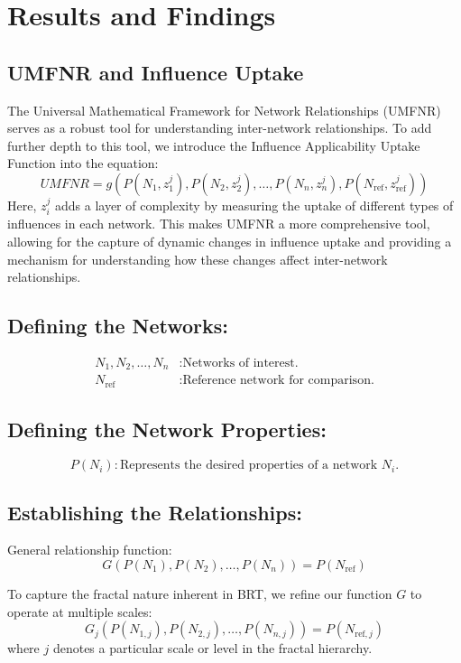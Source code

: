 \documentclass[sn-nature]{sn-jnl}%
\theoremstyle{thmstyleone}%
\theoremstyle{thmstyletwo}%
\theoremstyle{thmstylethree}%
\begin{document}
\section{Results and Findings}
\subsection{UMFNR and Influence Uptake}
The Universal Mathematical Framework for Network Relationships (UMFNR) serves as a robust tool for understanding inter-network relationships. To add further depth to this tool, we introduce the Influence Applicability Uptake Function into the equation:
\begin{equation}
UMFNR = g(P(N_1, z_1^j), P(N_2, z_2^j), \ldots, P(N_n, z_n^j), P(N_{\text{ref}}, z_{\text{ref}}^j))
\end{equation}
Here, \( z_i^j \) adds a layer of complexity by measuring the uptake of different types of influences in each network. This makes UMFNR a more comprehensive tool, allowing for the capture of dynamic changes in influence uptake and providing a mechanism for understanding how these changes affect inter-network relationships.

\subsection*{Defining the Networks:}
\begin{align*}
N_1, N_2, \dots, N_n & : \text{Networks of interest.} \\
N_{\text{ref}} & : \text{Reference network for comparison.}
\end{align*}

\subsection*{Defining the Network Properties:}
\[
P(N_i) : \text{Represents the desired properties of a network } N_i.
\]

\subsection*{Establishing the Relationships:}
General relationship function:
\[
G(P(N_1), P(N_2), \dots, P(N_n)) = P(N_{\text{ref}})
\]

To capture the fractal nature inherent in BRT, we refine our function \(G\) to operate at multiple scales:
\[
G_{j}(P(N_{1,j}), P(N_{2,j}), \dots, P(N_{n,j})) = P(N_{\text{ref},j})
\]
where \(j\) denotes a particular scale or level in the fractal hierarchy.
\end{document}
